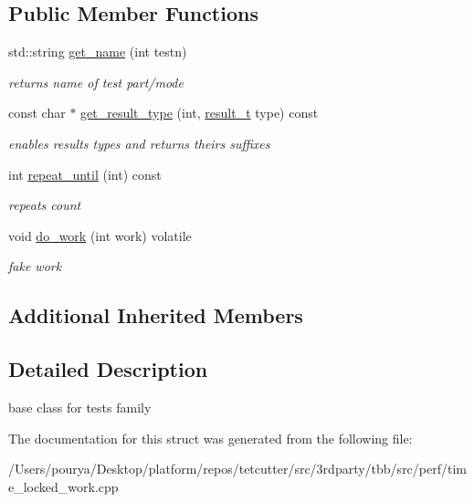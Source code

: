 \subsection*{Public Member Functions}
\begin{DoxyCompactItemize}
\item 
\hypertarget{structTestLocks_a3625e3a70d865884a46f65354ace71fc}{}std\+::string \hyperlink{structTestLocks_a3625e3a70d865884a46f65354ace71fc}{get\+\_\+name} (int testn)\label{structTestLocks_a3625e3a70d865884a46f65354ace71fc}

\begin{DoxyCompactList}\small\item\em returns name of test part/mode \end{DoxyCompactList}\item 
\hypertarget{structTestLocks_aaa770103e7d67c1e8a0690a2559cdd15}{}const char $\ast$ \hyperlink{structTestLocks_aaa770103e7d67c1e8a0690a2559cdd15}{get\+\_\+result\+\_\+type} (int, \hyperlink{classTesterBase_aa4b9a75a4516a4f3ab9485b437693811}{result\+\_\+t} type) const \label{structTestLocks_aaa770103e7d67c1e8a0690a2559cdd15}

\begin{DoxyCompactList}\small\item\em enables results types and returns theirs suffixes \end{DoxyCompactList}\item 
\hypertarget{structTestLocks_a272ef8a7869be4b0f5e57697e7e0a261}{}int \hyperlink{structTestLocks_a272ef8a7869be4b0f5e57697e7e0a261}{repeat\+\_\+until} (int) const \label{structTestLocks_a272ef8a7869be4b0f5e57697e7e0a261}

\begin{DoxyCompactList}\small\item\em repeats count \end{DoxyCompactList}\item 
\hypertarget{structTestLocks_a788621dd203d219f613954e9f2e1fbbc}{}void \hyperlink{structTestLocks_a788621dd203d219f613954e9f2e1fbbc}{do\+\_\+work} (int work) volatile\label{structTestLocks_a788621dd203d219f613954e9f2e1fbbc}

\begin{DoxyCompactList}\small\item\em fake work \end{DoxyCompactList}\end{DoxyCompactItemize}
\subsection*{Additional Inherited Members}


\subsection{Detailed Description}
base class for tests family 

The documentation for this struct was generated from the following file\+:\begin{DoxyCompactItemize}
\item 
/\+Users/pourya/\+Desktop/platform/repos/tetcutter/src/3rdparty/tbb/src/perf/time\+\_\+locked\+\_\+work.\+cpp\end{DoxyCompactItemize}

